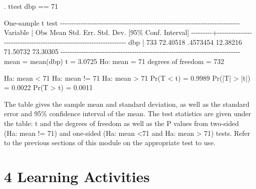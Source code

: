 \documentclass[
]{memoir}
\newenvironment{Shaded}{\begin{snugshade}}{\end{snugshade}}
\newcommand{\NormalTok}[1]{#1}
\begin{document}
\begin{Shaded}
\begin{Highlighting}[]
\NormalTok{. ttest dbp == 71}

\NormalTok{One{-}sample t test}
\NormalTok{{-}{-}{-}{-}{-}{-}{-}{-}{-}{-}{-}{-}{-}{-}{-}{-}{-}{-}{-}{-}{-}{-}{-}{-}{-}{-}{-}{-}{-}{-}{-}{-}{-}{-}{-}{-}{-}{-}{-}{-}{-}{-}{-}{-}{-}{-}{-}{-}{-}{-}{-}{-}{-}{-}{-}{-}{-}{-}{-}{-}{-}{-}{-}{-}{-}{-}{-}{-}{-}{-}{-}{-}{-}{-}{-}{-}{-}{-}}
\NormalTok{Variable |     Obs        Mean    Std. Err.   Std. Dev.   [95\% Conf. Interval]}
\NormalTok{{-}{-}{-}{-}{-}{-}{-}{-}{-}+{-}{-}{-}{-}{-}{-}{-}{-}{-}{-}{-}{-}{-}{-}{-}{-}{-}{-}{-}{-}{-}{-}{-}{-}{-}{-}{-}{-}{-}{-}{-}{-}{-}{-}{-}{-}{-}{-}{-}{-}{-}{-}{-}{-}{-}{-}{-}{-}{-}{-}{-}{-}{-}{-}{-}{-}{-}{-}{-}{-}{-}{-}{-}{-}{-}{-}{-}{-}}
\NormalTok{     dbp |     733    72.40518    .4573454    12.38216    71.50732    73.30305}
\NormalTok{{-}{-}{-}{-}{-}{-}{-}{-}{-}{-}{-}{-}{-}{-}{-}{-}{-}{-}{-}{-}{-}{-}{-}{-}{-}{-}{-}{-}{-}{-}{-}{-}{-}{-}{-}{-}{-}{-}{-}{-}{-}{-}{-}{-}{-}{-}{-}{-}{-}{-}{-}{-}{-}{-}{-}{-}{-}{-}{-}{-}{-}{-}{-}{-}{-}{-}{-}{-}{-}{-}{-}{-}{-}{-}{-}{-}{-}{-}}
\NormalTok{    mean = mean(dbp)                                              t =   3.0725}
\NormalTok{Ho: mean = 71                                    degrees of freedom =      732}

\NormalTok{    Ha: mean \textless{} 71               Ha: mean != 71                 Ha: mean \textgreater{} 71}
\NormalTok{ Pr(T \textless{} t) = 0.9989         Pr(|T| \textgreater{} |t|) = 0.0022          Pr(T \textgreater{} t) = 0.0011}
\end{Highlighting}
\end{Shaded}

The table gives the sample mean and standard deviation, as well as the standard error and 95\% confidence interval of the mean. The test statistics are given under the table: t and the degrees of freedom as well as the P values from two-sided (Ha: mean != 71) and one-sided (Ha: mean \textless71 and Ha: mean \textgreater{} 71) tests. Refer to the previous sections of this module on the appropriate test to use.

\hypertarget{learning-activities-3}{%
\chapter*{\texorpdfstring{\textbf{4} Learning Activities}{4 Learning Activities}}\label{learning-activities-3}}
\end{document}
